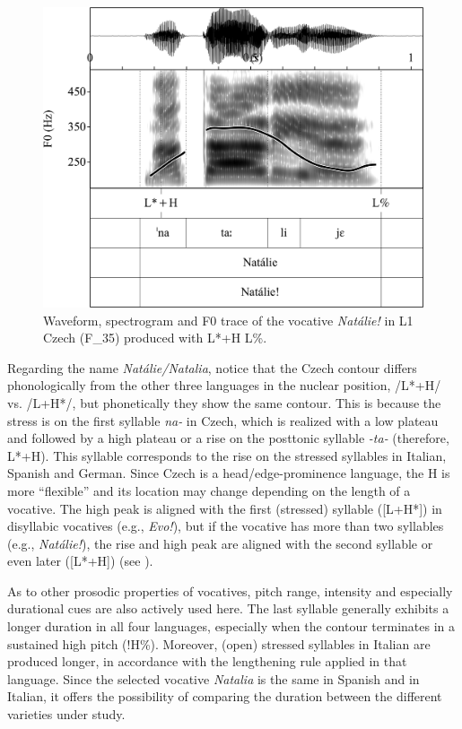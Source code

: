 \begin{figure}
\includegraphics[width=.8\textwidth]{figures/Figure_4.138.png}
\caption{Waveform, spectrogram and F0 trace of the vocative \textit{Natálie!} in L1 Czech (F\_35) produced with L*+H L\%.}
\label{fig:4.138}
\end{figure}


Regarding the name \textit{Natálie/Natalia}, notice that the Czech contour differs phonologically from the other three languages in the nuclear position, /L*+H/ vs. /L+H*/, but phonetically they show the same contour. This is because the stress is on the first syllable \textit{na-} in Czech, which is realized with a low plateau and followed by a high plateau or a rise on the posttonic syllable \textit{{}-ta-} (therefore, L*+H). This syllable corresponds to the rise on the stressed syllables in Italian, Spanish and German. Since Czech is a head/edge-prominence language, the H is more “flexible” and its location may change depending on the length of a vocative. The high peak is aligned with the first (stressed) syllable ([L+H*]) in disyllabic vocatives (e.g., \textit{Evo!}), but if the vocative has more than two syllables (e.g., \textit{Natálie!}), the rise and high peak are aligned with the second syllable or even later ([L*+H]) (see \citealt{PeškováForthcoming}).



As to other prosodic properties of vocatives, pitch range, intensity and especially durational cues are also actively used here. The last syllable generally exhibits a longer duration in all four languages, especially when the contour terminates in a sustained high pitch (!H\%). Moreover, (open) stressed syllables in Italian are produced longer, in accordance with the lengthening rule applied in that language. Since the selected vocative \textit{Natalia} is the same in Spanish and in Italian, it offers the possibility of comparing the duration between the different varieties under study.



